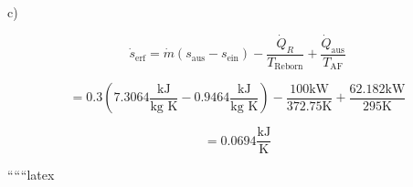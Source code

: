 c)

\[
\dot{s}_{\text{erf}} = \dot{m} (s_{\text{aus}} - s_{\text{ein}}) - \frac{\dot{Q}_R}{T_{\text{Reborn}}} + \frac{\dot{Q}_{\text{aus}}}{T_{\text{AF}}}
\]

\[
= 0.3 \left( 7.3064 \frac{\text{kJ}}{\text{kg K}} - 0.9464 \frac{\text{kJ}}{\text{kg K}} \right) - \frac{100 \text{kW}}{372.75 \text{K}} + \frac{62.182 \text{kW}}{295 \text{K}}
\]

\[
= 0.0694 \frac{\text{kJ}}{\text{K}}
\]

``````latex